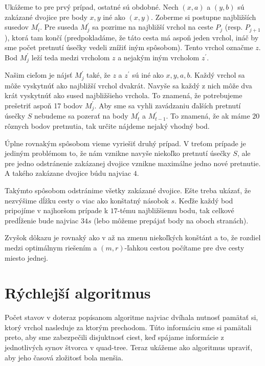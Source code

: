 \begin{dokaz}
Ukážeme to pre prvý prípad, ostatné sú obdobné. 
Nech $(x, a)$ a $(y, b)$ sú zakázané dvojice pre body $x, y$ iné ako $(x,y)$. 
Zoberme si postupne najbližších susedov $M_i^{'}$. Pre suseda $M^{'}_j$ sa pozrime na najbližší vrchol na
ceste $P_j$ (resp. $P_{j+1}$), ktorá tam končí (predpokladáme, že táto cesta má aspoň jeden vrchol, ináč by sme počet
pretnutí úsečky vedeli znížiť iným spôsobom). Tento vrchol označme $z$. Bod $M^{'}_j$ leží teda
medzi vrcholom $z$ a nejakým iným vrcholom $z^{'}$.  

Našim cieľom je nájsť $M_j^{'}$ také, že $z$ a $z^{'}$ sú iné ako $x, y, a, b$. Každý vrchol sa môže
vyskytnúť ako najbližší vrchol dvakrát. Navyše sa každý z nich môže dva krát vyskytnúť ako sused
najbližšieho vrchola. To znamená, že potrebujeme prešetriť aspoň 17 bodov $M_j^{'}$.
Aby sme sa vyhli zavádzaniu ďalších pretnutí úsečky $S$ nebudeme sa pozerať na body $M_t^{'}$ a
$M_{t-1}^{'}$. To znamená, že ak máme $20$ rôznych bodov pretnutia, tak určite nájdeme nejaký vhodný bod.

Úplne rovnakým spôsobom vieme vyriešiť druhý prípad. V treťom prípade je jediným problémom to, že
nám vznikne navyše niekoľko pretnutí úsečky $S$, ale pre jedno odstránenie zakázanej dvojice vznikne
maximálne jedno nové pretnutie. A takého zakázane dvojice búdu najviac $4$. 

Takýmto spôsobom odstránime všetky zakázané dvojice. Ešte treba ukázať, že nezvýšime dĺžku cesty
o viac ako konštatný násobok $s$. Keďže každý bod pripojíme v najhoršom prípade k $17$-tému
najbližšiemu bodu, tak celkové predĺženie bude najviac $34s$ (lebo môžeme prepájať body na oboch
stranách). 
\end{dokaz}

Zvyšok dôkazu je rovnaký ako v \cite{Arora} až na zmenu niekoľkých konštánt a to, že
rozdiel medzi optimálnym riešením a $(m,r)$-ľahkou cestou počítame pre dve cesty
miesto jednej.

\section{Rýchlejší algoritmus}

Počet stavov v doteraz popísanom algoritme najviac dvíhala nutnosť pamätať si, ktorý vrchol
nasleduje za ktorým prechodom. Túto informáciu sme si pamätali preto, aby sme zabezpečili
disjuktnosť ciest, keď spájame informácie z jednotlivých synov štvorca v quad-tree.
Teraz ukážeme ako algoritmus upraviť, aby jeho časová zložitosť bola menšia.

